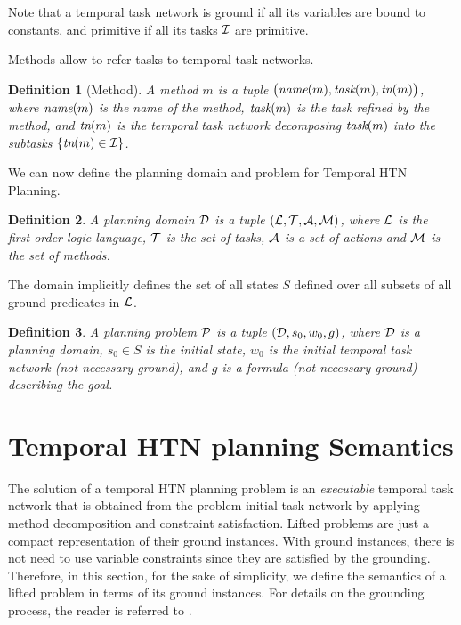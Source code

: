 \documentclass[letterpaper]{article} %
\newtheorem{definition}{Definition}
\newcommand{\name}{\text{\it name}}
\newcommand{\task}{\text{\it task}}
\newcommand{\tn}{\text{\it tn}}
\begin{document}
Note that a temporal task network is ground if all its variables are bound to constants, and primitive if all its tasks ${\cal{I}}$ are primitive.

Methods allow to refer tasks to temporal task networks.
\begin{definition}[Method]
A {\em method} $m$ is a tuple $\bigl(\name(m), \task(m), \tn(m)\bigr)$, where $\name(m)$ is the name of the method, $\task(m)$ is the task refined by the method, and $\tn(m)$ is the temporal task network decomposing $\task(m)$ into the subtasks $\{\tn(m) \in \cal{I}\}$.
\end{definition}
 We can now define the planning domain and problem for Temporal HTN Planning.
\begin{definition}
 A {\em planning domain} $\cal{D}$ is a tuple $({\cal{L}}, {\cal{T}}, {\cal{A}}, {\cal{M}})$, where $\cal{L}$ is the first-order logic language, $\cal{T}$ is the set of tasks, ${\cal{A}}$ is a set of actions and $\cal{M}$ is the set of methods. %
 \end{definition}

 The domain implicitly defines the set of all states $S$ defined over all subsets of all ground predicates in $\cal{L}$.

 \begin{definition}
 A {\em planning problem} $\cal{P}$ is a tuple $({\cal{D}}, {s_0}, w_0, g)$, where $\cal{D}$ is a planning domain, $s_0 \in S$ is the initial state, $w_0$ is the initial temporal task network (not necessary ground), and $g$ is a formula (not necessary ground) describing the goal.
 \end{definition}

 \section{Temporal HTN planning Semantics}
 \label{THTN}

 The solution of a temporal HTN planning problem is an {\it executable} temporal task network that is obtained from the problem initial task network by applying method decomposition and constraint satisfaction. Lifted problems are just a compact representation of their ground instances. With ground instances, there is not need to use variable constraints since they are satisfied by the grounding. Therefore, in this section, for the sake of simplicity, we define the semantics of a lifted problem in terms of its ground instances. For details on the grounding process, the reader is referred to \cite{behnke20,ramoul17}.
\end{document}

